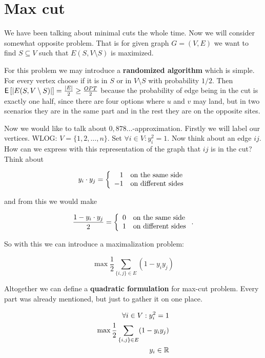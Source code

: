 \chapter{Max cut}

We have been talking about minimal cuts the whole time. Now we will consider somewhat opposite problem. That is for given graph $G = (V,E)$ we want to find $S \subseteq V$ such that $E(S, V \setminus S)$ is maximized.

For this problem we may introduce a \textbf{randomized algorithm} which is simple. For every vertex choose if it is in $S$ or in $V \setminus S$ with probability $1/2$. Then $\operatorname{\textsf{E}\,} [|E(S, V \setminus S)|] = \frac{|E|}{2} \geq \frac{OPT}{2}$ because the probability of edge being in the cut is exactly one half, since there are four options where $u$ and $v$ may land, but in two scenarios they are in the same part and in the rest they are on the opposite sites.

Now we would like to talk about $0,878\dots$-approximation. Firstly we will label our vertices. WLOG: $V = \{1, 2, \dots, n\}$. Set $\forall i \in V: y_{i}^2 =1$. Now think about an edge $ij$. How can we express with this representation of the graph that $ij$ is in the cut? Think about

$$
y_{i} \cdot y_{j} = \left\{
\begin{array}{r l}
	1 & \text{on the same side} \\
	-1 & \text{on different sides}
\end{array}
\right.
$$

and from this we would make

$$
\frac{1 - y_{i}\cdot y_{j}}{2} = \left\{
\begin{array}{r l}
	0 & \text{on the same side} \\
	1 & \text{on different sides}
\end{array}
\right..
$$

So with this we can introduce a maximalization problem:

$$
\max \frac{1}{2} \sum_{\{i,j\} \in E} (1 - y_i y_j)
$$

Altogether we can define a \textbf{quadratic formulation} for max-cut problem. Every part was already mentioned, but just to gather it on one place.

$$
\begin{aligned}
	\forall i \in V: y_{i}^2 = 1 \\
	\max \frac{1}{2} \sum_{\{i,j\} \in E} (1 - y_i y_j) \\
	y_{i} \in \mathbb{R}
\end{aligned}
$$

